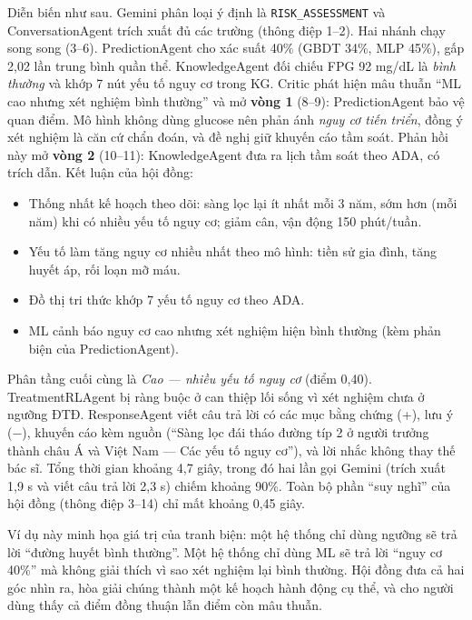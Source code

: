 Diễn biến như sau. Gemini phân loại ý định là \texttt{RISK\_ASSESSMENT} và ConversationAgent trích xuất đủ các trường (thông điệp 1–2). Hai nhánh chạy song song (3–6). PredictionAgent cho xác suất 40\% (GBDT 34\%, MLP 45\%), gấp 2,02 lần trung bình quần thể. KnowledgeAgent đối chiếu FPG 92 mg/dL là \emph{bình thường} và khớp 7 nút yếu tố nguy cơ trong KG. Critic phát hiện mâu thuẫn ``ML cao nhưng xét nghiệm bình thường'' và mở \textbf{vòng 1} (8–9): PredictionAgent bảo vệ quan điểm. Mô hình không dùng glucose nên phản ánh \emph{nguy cơ tiến triển}, đồng ý xét nghiệm là căn cứ chẩn đoán, và đề nghị giữ khuyến cáo tầm soát. Phản hồi này mở \textbf{vòng 2} (10–11): KnowledgeAgent đưa ra lịch tầm soát theo ADA, có trích dẫn. Kết luận của hội đồng:

\begin{itemize}
  \item[\textbf{(+)}] Thống nhất kế hoạch theo dõi: sàng lọc lại ít nhất mỗi 3 năm, sớm hơn (mỗi năm) khi có nhiều yếu tố nguy cơ; giảm cân, vận động 150 phút/tuần.
  \item[\textbf{(+)}] Yếu tố làm tăng nguy cơ nhiều nhất theo mô hình: tiền sử gia đình, tăng huyết áp, rối loạn mỡ máu.
  \item[\textbf{(+)}] Đồ thị tri thức khớp 7 yếu tố nguy cơ theo ADA.
  \item[\textbf{(−)}] ML cảnh báo nguy cơ cao nhưng xét nghiệm hiện bình thường (kèm phản biện của PredictionAgent).
\end{itemize}

Phân tầng cuối cùng là \emph{Cao — nhiều yếu tố nguy cơ} (điểm 0,40). TreatmentRLAgent bị ràng buộc ở can thiệp lối sống vì xét nghiệm chưa ở ngưỡng ĐTĐ. ResponseAgent viết câu trả lời có các mục bằng chứng (+), lưu ý (−), khuyến cáo kèm nguồn (``Sàng lọc đái tháo đường típ 2 ở người trưởng thành châu Á và Việt Nam — Các yếu tố nguy cơ''), và lời nhắc không thay thế bác sĩ. Tổng thời gian khoảng 4,7 giây, trong đó hai lần gọi Gemini (trích xuất 1,9 s và viết câu trả lời 2,3 s) chiếm khoảng 90\%. Toàn bộ phần ``suy nghĩ'' của hội đồng (thông điệp 3–14) chỉ mất khoảng 0,45 giây.

Ví dụ này minh họa giá trị của tranh biện: một hệ thống chỉ dùng ngưỡng sẽ trả lời ``đường huyết bình thường''. Một hệ thống chỉ dùng ML sẽ trả lời ``nguy cơ 40\%'' mà không giải thích vì sao xét nghiệm lại bình thường. Hội đồng đưa cả hai góc nhìn ra, hòa giải chúng thành một kế hoạch hành động cụ thể, và cho người dùng thấy cả điểm đồng thuận lẫn điểm còn mâu thuẫn.

